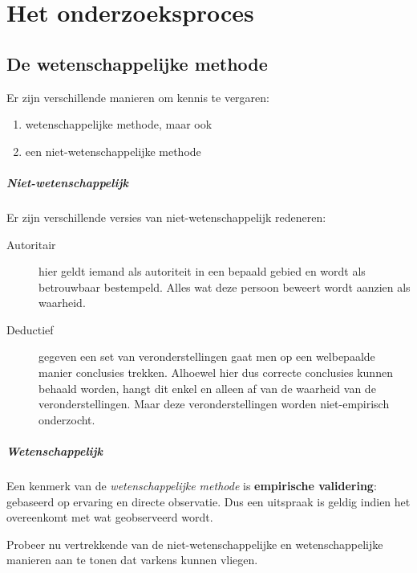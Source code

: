 \chapter{Het onderzoeksproces}
\label{ch:onderzoeksproces}

\section{De wetenschappelijke methode}

Er zijn verschillende manieren om kennis te vergaren:

\begin{enumerate}
  \item wetenschappelijke methode, maar ook 
  \item een niet-wetenschappelijke methode
\end{enumerate}

\paragraph{Niet-wetenschappelijk}Er zijn verschillende versies van niet-wetenschappelijk redeneren: 
\begin{description}
  \item [Autoritair] hier geldt iemand als autoriteit in een bepaald gebied en wordt als betrouwbaar bestempeld. Alles wat deze persoon beweert wordt aanzien als waarheid. 
  \item [Deductief] gegeven een set van veronderstellingen gaat men op een welbepaalde manier conclusies trekken. Alhoewel hier dus correcte conclusies kunnen behaald worden, hangt dit enkel en alleen af van de waarheid van de veronderstellingen. Maar deze veronderstellingen worden niet-empirisch onderzocht.
\end{description}

\paragraph{Wetenschappelijk}
Een kenmerk van de \textsl{wetenschappelijke methode} is \textbf{empirische validering}: gebaseerd op ervaring en directe observatie. Dus een uitspraak is geldig indien het overeenkomt met wat geobserveerd wordt.

\begin{exercise}
Probeer nu vertrekkende van de niet-wetenschappelijke en wetenschappelijke manieren aan te tonen dat varkens kunnen vliegen. 
\end{exercise}

